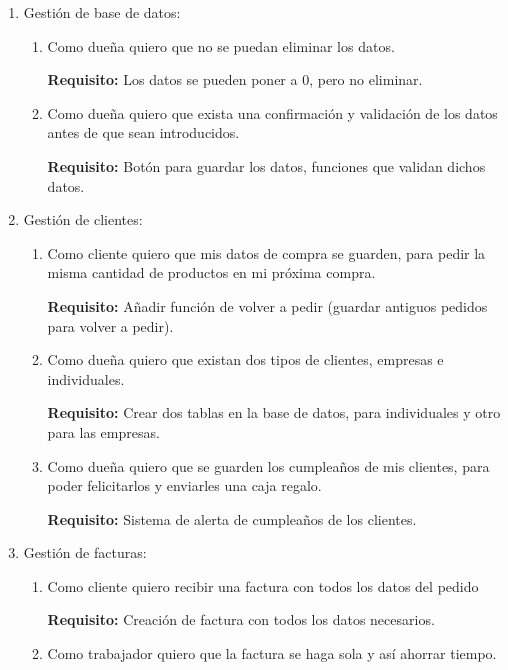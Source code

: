 \begin{enumerate}

    \item Gestión de base de datos:
    \begin{enumerate}
        \item  Como dueña quiero que no se puedan eliminar los datos.

        \textbf{Requisito:} Los datos se pueden poner a 0, pero no eliminar.

        \item Como dueña quiero que exista una confirmación y validación de los datos antes de que sean introducidos.

        \textbf{Requisito:} Botón para guardar los datos, funciones que validan dichos datos.
    \end{enumerate}

    \item Gestión de clientes:
    \begin{enumerate}
        \item Como cliente quiero que mis datos de compra se guarden, para pedir la misma  cantidad de productos en mi próxima compra.

        \textbf{Requisito:} Añadir función de volver a pedir (guardar antiguos pedidos para  volver a pedir).

        \item Como dueña quiero que existan dos tipos de clientes, empresas e individuales.

        \textbf{Requisito:} Crear dos tablas en la base de datos, para individuales y otro para las empresas.

        \item Como dueña quiero que se guarden los cumpleaños de mis clientes, para poder felicitarlos y enviarles una caja regalo.

        \textbf{Requisito:} Sistema de alerta de cumpleaños de los clientes.
    \end{enumerate}

    \item Gestión de facturas:
    \begin{enumerate}
        \item Como cliente quiero recibir una factura con todos los datos del pedido

        \textbf{Requisito:} Creación de factura con todos los datos necesarios.

        \item Como trabajador quiero que la factura se haga sola y así ahorrar tiempo.
    

\end{enumerate}
\end{enumerate}
